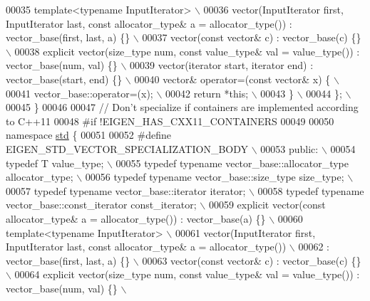\begin{DoxyCode}
00035 \textcolor{preprocessor}{    template<typename InputIterator> \(\backslash\)}
00036 \textcolor{preprocessor}{    vector(InputIterator first, InputIterator last, const allocator\_type& a = allocator\_type()) :
       vector\_base(first, last, a) \{\} \(\backslash\)}
00037 \textcolor{preprocessor}{    vector(const vector& c) : vector\_base(c) \{\}  \(\backslash\)}
00038 \textcolor{preprocessor}{    explicit vector(size\_type num, const value\_type& val = value\_type()) : vector\_base(num, val) \{\} \(\backslash\)}
00039 \textcolor{preprocessor}{    vector(iterator start, iterator end) : vector\_base(start, end) \{\}  \(\backslash\)}
00040 \textcolor{preprocessor}{    vector& operator=(const vector& x) \{  \(\backslash\)}
00041 \textcolor{preprocessor}{      vector\_base::operator=(x);  \(\backslash\)}
00042 \textcolor{preprocessor}{      return *this;  \(\backslash\)}
00043 \textcolor{preprocessor}{    \} \(\backslash\)}
00044 \textcolor{preprocessor}{  \}; \(\backslash\)}
00045 \textcolor{preprocessor}{\}}
00046 
00047 \textcolor{comment}{// Don't specialize if containers are implemented according to C++11}
00048 \textcolor{preprocessor}{#if !EIGEN\_HAS\_CXX11\_CONTAINERS}
00049 
00050 \textcolor{keyword}{namespace }\hyperlink{namespacestd}{std} \{
00051 
00052 \textcolor{preprocessor}{#define EIGEN\_STD\_VECTOR\_SPECIALIZATION\_BODY \(\backslash\)}
00053 \textcolor{preprocessor}{  public:  \(\backslash\)}
00054 \textcolor{preprocessor}{    typedef T value\_type; \(\backslash\)}
00055 \textcolor{preprocessor}{    typedef typename vector\_base::allocator\_type allocator\_type; \(\backslash\)}
00056 \textcolor{preprocessor}{    typedef typename vector\_base::size\_type size\_type;  \(\backslash\)}
00057 \textcolor{preprocessor}{    typedef typename vector\_base::iterator iterator;  \(\backslash\)}
00058 \textcolor{preprocessor}{    typedef typename vector\_base::const\_iterator const\_iterator;  \(\backslash\)}
00059 \textcolor{preprocessor}{    explicit vector(const allocator\_type& a = allocator\_type()) : vector\_base(a) \{\}  \(\backslash\)}
00060 \textcolor{preprocessor}{    template<typename InputIterator> \(\backslash\)}
00061 \textcolor{preprocessor}{    vector(InputIterator first, InputIterator last, const allocator\_type& a = allocator\_type()) \(\backslash\)}
00062 \textcolor{preprocessor}{    : vector\_base(first, last, a) \{\} \(\backslash\)}
00063 \textcolor{preprocessor}{    vector(const vector& c) : vector\_base(c) \{\}  \(\backslash\)}
00064 \textcolor{preprocessor}{    explicit vector(size\_type num, const value\_type& val = value\_type()) : vector\_base(num, val) \{\} \(\backslash\)}

\end{DoxyCode}
